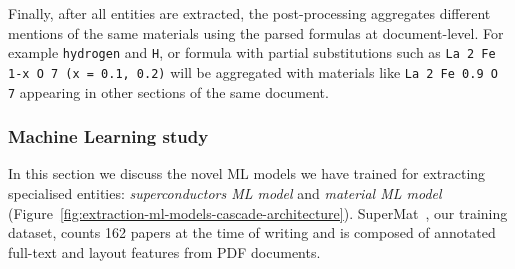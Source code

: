 \documentclass[]{interact}
\theoremstyle{plain}%
\theoremstyle{definition}
\theoremstyle{remark}
\begin{document}
\begin{table}[ht]
\centering
{}
\caption{\label{tab:material-parser-entities} Synthesis of the material parser entities. }
\end{table}

Finally, after all entities are extracted, the post-processing aggregates different mentions of the same materials using the parsed formulas at document-level. 
For example \texttt{hydrogen} and \texttt{H}, or formula with partial substitutions such as \texttt{La 2 Fe 1-x O 7 (x = 0.1, 0.2)} will be aggregated with materials like \texttt{La 2 Fe 0.9 O 7} appearing in other sections of the same document. 

\subsubsection*{Machine Learning study}

In this section we discuss the novel ML models we have trained for extracting specialised entities: \textit{superconductors ML model} and \textit{material ML model} (Figure~\ref{fig:extraction-ml-models-cascade-architecture}). 
SuperMat~\cite{foppiano2021supermat}, our training dataset, counts 162 papers at the time of writing and is composed of annotated full-text and layout features from PDF documents. 
\end{document}
